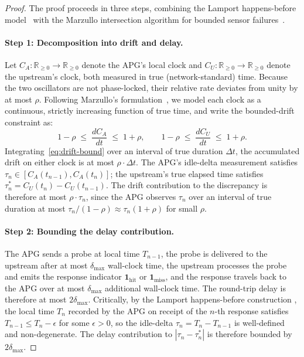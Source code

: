 \documentclass[10pt,twocolumn]{article}
\theoremstyle{definition}
\theoremstyle{remark}
\begin{document}
\begin{proof}
The proof proceeds in three steps, combining the Lamport happens-before
model~\citep{lamport1978} with the Marzullo intersection algorithm for
bounded sensor failures~\citep{marzullo1994}.

\paragraph{Step 1: Decomposition into drift and delay.}
Let $C_A : \mathbb{R}_{\ge 0} \to \mathbb{R}_{\ge 0}$ denote the APG's
local clock and $C_U : \mathbb{R}_{\ge 0} \to \mathbb{R}_{\ge 0}$ denote
the upstream's clock, both measured in true (network-standard) time.
Because the two oscillators are not phase-locked, their relative rate
deviates from unity by at most $\rho$. Following Marzullo's
formulation~\citep{marzullo1994}, we model each clock as a continuous,
strictly increasing function of true time, and write the bounded-drift
constraint as:
\begin{equation}
1 - \rho \;\le\; \frac{dC_A}{dt} \;\le\; 1 + \rho, \qquad
1 - \rho \;\le\; \frac{dC_U}{dt} \;\le\; 1 + \rho.
\label{eq:drift-bound}
\end{equation}
Integrating~\eqref{eq:drift-bound} over an interval of true duration
$\Delta t$, the accumulated drift on either clock is at most
$\rho \cdot \Delta t$. The APG's idle-delta measurement satisfies
$\tau_n \in [C_A(t_{n-1}), C_A(t_n)]$; the upstream's true elapsed
time satisfies $\tau_n^* = C_U(t_n) - C_U(t_{n-1})$. The drift
contribution to the discrepancy is therefore at most $\rho \cdot
\tau_n$, since the APG observes $\tau_n$ over an interval of true
duration at most $\tau_n / (1 - \rho) \approx \tau_n (1 + \rho)$ for
small $\rho$.

\paragraph{Step 2: Bounding the delay contribution.}
The APG sends a probe at local time $T_{n-1}$, the probe is delivered
to the upstream after at most $\delta_{\max}$ wall-clock time, the
upstream processes the probe and emits the response indicator
$\mathbf{1}_{\text{hit}}$ or $\mathbf{1}_{\text{miss}}$, and the response
travels back to the APG over at most $\delta_{\max}$ additional wall-clock
time. The round-trip delay is therefore at most $2 \delta_{\max}$.
Critically, by the Lamport happens-before construction
\citep{lamport1978}, the local time $T_n$ recorded by the APG on receipt
of the $n$-th response satisfies $T_{n-1} \le T_n - \epsilon$ for some
$\epsilon > 0$, so the idle-delta $\tau_n = T_n - T_{n-1}$ is
well-defined and non-degenerate. The delay contribution to
$|\tau_n - \tau_n^*|$ is therefore bounded by $2 \delta_{\max}$.


\end{proof}
\end{document}
